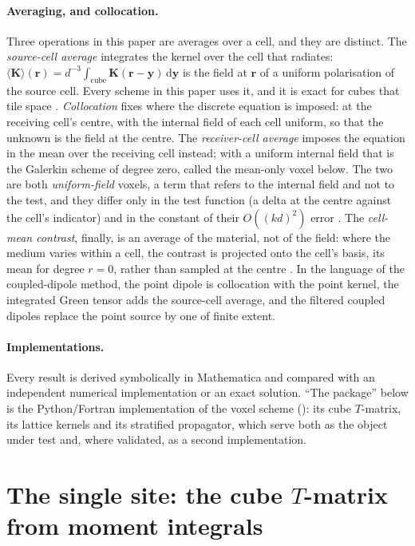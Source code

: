\documentclass[11pt,a4paper]{article}
\newcommand{\bK}{\mathbf{K}}
\newcommand{\dd}{\mathrm{d}}
\begin{document}
\paragraph{Averaging, and collocation.} Three operations in this paper are averages over a cell,
and they are distinct. The \emph{source-cell average} integrates the kernel over the cell that
radiates: $\langle\bK\rangle(\mathbf r)=d^{-3}\int_{\text{cube}}\bK(\mathbf r-\mathbf y)\,\dd\mathbf y$
is the field at $\mathbf r$ of a uniform polarisation of the source cell. Every scheme in this paper
uses it, and it is exact for cubes that tile space \citep{NestorError2026}. \emph{Collocation} fixes where the discrete
equation is imposed: at the receiving cell's centre, with the internal field of each cell uniform, so
that the unknown is the field at the centre. The \emph{receiver-cell average} imposes the equation in
the mean over the receiving cell instead; with a uniform internal field that is the Galerkin scheme
of degree zero, called the mean-only voxel below. The two are both \emph{uniform-field} voxels, a
term that refers to the internal field and not to the test, and they differ only in the test
function (a delta at the centre against the cell's indicator) and in the constant of their
$O((kd)^2)$ error \citep{NestorError2026}. The \emph{cell-mean contrast}, finally, is an average of
the material, not of the field: where the medium varies within a cell, the contrast is projected
onto the cell's basis, its mean for degree $r=0$, rather than sampled at the centre
\citep{NestorError2026}. In the language of the coupled-dipole method, the point
dipole is collocation with the point kernel, the integrated Green tensor adds the source-cell
average, and the filtered coupled dipoles replace the point source by one of finite extent.

\paragraph{Implementations.} Every result is derived symbolically in Mathematica and compared with
an independent numerical implementation or an exact solution. ``The package'' below is the Python/Fortran
implementation of the voxel scheme (): its cube $T$-matrix, its lattice
kernels and its stratified propagator, which serve both as the object under test and, where
validated, as a second implementation.


\section{The single site: the cube \texorpdfstring{$T$}{T}-matrix from moment integrals}\label{sec:single}
\end{document}
